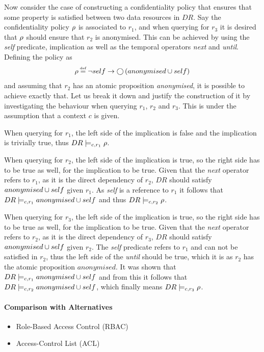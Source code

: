 \begin{example}
Now consider the case of constructing a confidentiality policy that ensures that some property is satisfied between two data resources in $DR$. Say the confidentiality policy $\rho$ is associated to $r_1$, and when querying for $r_3$ it is desired that $\rho$ should ensure that $r_2$ is anonymised. This can be achieved by using the \emph{self} predicate, implication as well as the temporal operators \emph{next} and \emph{until}. Defining the policy as 
\begin{align*}
    \conf \eqdef \lnot self \imply \X \left( anonymised \U self \right)
\end{align*}
and assuming that $r_2$ has an atomic proposition \emph{anonymised}, it is possible to achieve exactly that. Let us break it down and justify the construction of it by investigating the behaviour when querying $r_1$, $r_2$ and $r_3$. This is under the assumption that a context $c$ is given.

When querying for $r_1$, the left side of the implication is false and the implication is trivially true, thus $DR \models_{c,r_1} \rho$. 

When querying for $r_2$, the left side of the implication is true, so the right side has to be true as well, for the implication to be true. Given that the \emph{next} operator refers to $r_1$, as it is the direct dependency of $r_2$, $DR$ should satisfy $anonymised \cup self$ given $r_1$. As \emph{self} is a reference to $r_1$ it follows that $DR \models_{c,r_1} anonymised \cup self$ and thus $DR \models_{c,r_2} \rho$.

When querying for $r_3$, the left side of the implication is true, so the right side has to be true as well, for the implication to be true. Given that the \emph{next} operator refers to $r_2$, as it is the direct dependency of $r_3$, $DR$ should satisfy $anonymised \cup self$ given $r_2$. The \emph{self} predicate refers to $r_1$ and can not be satisfied in $r_2$, thus the left side of the \emph{until} should be true, which it is as $r_2$ has the atomic proposition $anonymised$. It was shown that $DR \models_{c,r_1} anonymised \cup self$ and from this it follows that $DR \models_{c,r_2} anonymised \cup self$, which finally means $DR \models_{c,r_3} \rho$.
\end{example}

\paragraph{Comparison with Alternatives}
\begin{itemize}
    \item Role-Based Access Control (RBAC)
    \item Access-Control List (ACL)
\end{itemize}

